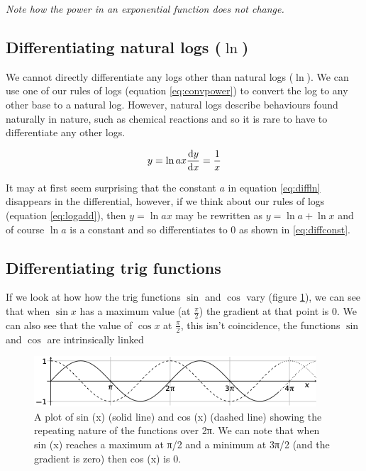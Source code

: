 \documentclass[
]{book}
\begin{document}
\emph{Note how the power in an exponential function does not change.}

\hypertarget{subsec:difflogs}{%
\subsection{\texorpdfstring{Differentiating natural logs (\(\ln\))}{Differentiating natural logs (\textbackslash ln)}}\label{subsec:difflogs}}

We cannot directly differentiate any logs other than natural logs (\(\ln\)). We can use one of our rules of logs (equation \eqref{eq:convpower}) to convert the log to any other base to a natural log. However, natural logs describe behaviours found naturally in nature, such as chemical reactions and so it is rare to have to differentiate any other logs.

\begin{equation}
y = \ln {ax}\\
\frac{\textrm{d}y}{\textrm{d}x}=\frac{1}{x}
\label{eq:diffln}
\end{equation}

It may at first seem surprising that the constant \(a\) in equation \eqref{eq:diffln} disappears in the differential, however, if we think about our rules of logs (equation \eqref{eq:logadd}), then \(y=\ln {ax}\) may be rewritten as \(y = \ln a +\ln x\) and of course \(\ln a\) is a constant and so differentiates to 0 as shown in \eqref{eq:diffconst}.

\hypertarget{subsec:difftrig}{%
\subsection{Differentiating trig functions}\label{subsec:difftrig}}

If we look at how how the trig functions \(\sin\) and \(\cos\) vary (figure \ref{fig:trigcyclic}), we can see that when \(\sin x\) has a maximum value (at \(\frac{\pi}{2}\)) the gradient at that point is 0. We can also see that the value of \(\cos x\) at \(\frac{\pi}{2}\), this isn't coincidence, the functions \(\sin\) and \(\cos\) are intrinsically linked

\begin{figure}

{\centering \includegraphics[width=0.8\linewidth]{images/trigcyclic} 

}

\caption{A plot of sin (x) (solid line) and cos (x) (dashed line) showing the repeating nature of the functions over 2π. We can note that when sin (x) reaches a maximum at π/2 and a minimum at 3π/2 (and the gradient is zero) then cos (x) is 0.}\label{fig:trigcyclic}
\end{figure}
\end{document}
